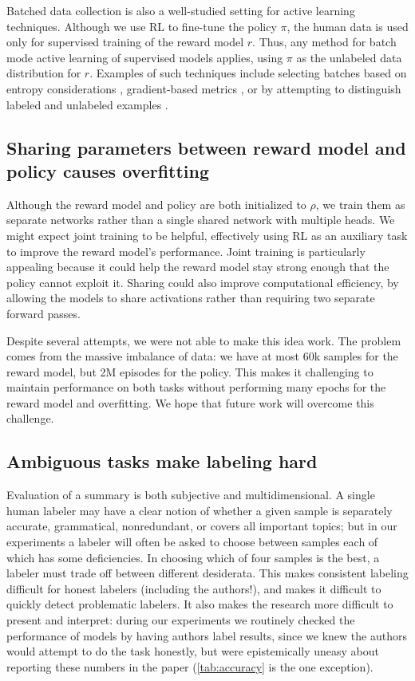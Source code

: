\documentclass{article}
\begin{document}
Batched data collection is also a well-studied setting for active learning techniques.  Although we use RL to fine-tune the policy $\pi$, the human data is used only for supervised training of the reward model $r$.  Thus, any method for batch mode active learning of supervised models applies, using $\pi$ as the unlabeled data distribution for $r$.  Examples of such techniques include selecting batches based on entropy considerations \citep{guo2008discriminative}, gradient-based metrics \citep{huang2016active,ash2019deep}, or by attempting to distinguish labeled and unlabeled examples \citep{gissin2019discriminative}.

\subsection{Sharing parameters between reward model and policy causes overfitting \label{sec:sharing}}

Although the reward model and policy are both initialized to $\rho$, we train them as separate networks rather than a single shared network with multiple heads.
We might expect joint training to be helpful, effectively using RL as an auxiliary task to improve the reward model's performance.
Joint training is particularly appealing
because it could help the reward model stay strong enough
that the policy cannot exploit it.
Sharing could also improve computational efficiency,
by allowing the models to share activations rather than requiring two separate forward passes.

Despite several attempts, we were not able to make this idea work.
The problem comes from the massive imbalance of data:
we have at most 60k samples for the reward model,
but 2M episodes for the policy.
This makes it challenging to maintain performance on both tasks
without performing many epochs for the reward model and overfitting.
We hope that future work will overcome this challenge.

\subsection{Ambiguous tasks make labeling hard}

Evaluation of a summary is both subjective and multidimensional.  A single human labeler may have a clear notion of whether a given sample is separately accurate, grammatical, nonredundant, or covers all important topics; but in our experiments
a labeler will often be asked to choose between samples each of which has some deficiencies.
In choosing which of four samples is the best, a labeler must trade off between different desiderata.
This makes consistent labeling difficult for honest labelers (including the authors!), and makes it difficult to quickly detect problematic labelers.
It also makes the research more difficult to present and interpret: during our experiments we routinely checked the performance of models by having authors label results, since we knew the authors would attempt to do the task honestly, but were epistemically uneasy about reporting these numbers in the paper (\cref{tab:accuracy} is the one exception).
\end{document}
